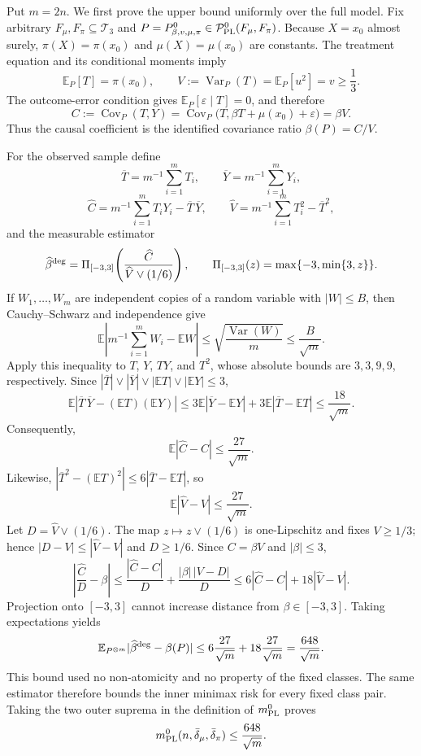 Put \(m=2n\). We first prove the upper bound uniformly over the full model. Fix arbitrary \(F_\mu,F_\pi\subseteq\mathcal T_3\) and \(P=P^0_{\beta,v,\mu,\pi}\in\mathcal P_{\rm PL}^{0}(F_\mu,F_\pi)\). Because \(X=x_0\) almost surely, \(\pi(X)=\pi(x_0)\) and \(\mu(X)=\mu(x_0)\) are constants. The treatment equation and its conditional moments imply
\[
\mathbb E_P[T]=\pi(x_0),\qquad V:=\operatorname{Var}_P(T)=\mathbb E_P[u^2]=v\ge\frac13.
\]
The outcome-error condition gives \(\mathbb E_P[\varepsilon\mid T]=0\), and therefore
\[
C:=\operatorname{Cov}_P(T,Y)=\operatorname{Cov}_P\bigl(T,\beta T+\mu(x_0)+\varepsilon\bigr)=\beta V.
\]
Thus the causal coefficient is the identified covariance ratio \(\beta(P)=C/V\).

For the observed sample define
\[
\overline T=m^{-1}\sum_{i=1}^mT_i,\qquad \overline Y=m^{-1}\sum_{i=1}^mY_i,
\]
\[
\widehat C=m^{-1}\sum_{i=1}^mT_iY_i-\overline T\,\overline Y,\qquad \widehat V=m^{-1}\sum_{i=1}^mT_i^2-\overline T^2,
\]
and the measurable estimator
\[
\widehat\beta^{\rm deg}=\Pi_{[-3,3]}\!\left(\frac{\widehat C}{\widehat V\vee(1/6)}\right),\qquad \Pi_{[-3,3]}(z)=\max\{-3,\min\{3,z\}\}.
\]
If \(W_1,\ldots,W_m\) are independent copies of a random variable with \(|W|\le B\), then Cauchy--Schwarz and independence give
\[
\mathbb E\left|m^{-1}\sum_{i=1}^mW_i-\mathbb EW\right|\le\sqrt{\frac{\operatorname{Var}(W)}m}\le\frac{B}{\sqrt m}.
\]
Apply this inequality to \(T\), \(Y\), \(TY\), and \(T^2\), whose absolute bounds are \(3,3,9,9\), respectively. Since \(|\overline T|\vee|\overline Y|\vee|\mathbb ET|\vee|\mathbb EY|\le3\),
\[
\mathbb E\left|\overline T\,\overline Y-(\mathbb ET)(\mathbb EY)\right|\le3\mathbb E|\overline Y-\mathbb EY|+3\mathbb E|\overline T-\mathbb ET|\le\frac{18}{\sqrt m}.
\]
Consequently,
\[
\mathbb E|\widehat C-C|\le\frac{27}{\sqrt m}.
\]
Likewise, \(|\overline T^2-(\mathbb ET)^2|\le6|\overline T-\mathbb ET|\), so
\[
\mathbb E|\widehat V-V|\le\frac{27}{\sqrt m}.
\]
Let \(D=\widehat V\vee(1/6)\). The map \(z\mapsto z\vee(1/6)\) is one-Lipschitz and fixes \(V\ge1/3\); hence \(|D-V|\le|\widehat V-V|\) and \(D\ge1/6\). Since \(C=\beta V\) and \(|\beta|\le3\),
\[
\left|\frac{\widehat C}{D}-\beta\right|\le\frac{|\widehat C-C|}{D}+\frac{|\beta|\,|V-D|}{D}\le6|\widehat C-C|+18|\widehat V-V|.
\]
Projection onto \([-3,3]\) cannot increase distance from \(\beta\in[-3,3]\). Taking expectations yields
\[
\mathbb E_{P^{\otimes m}}|\widehat\beta^{\rm deg}-\beta(P)|\le6\frac{27}{\sqrt m}+18\frac{27}{\sqrt m}=\frac{648}{\sqrt m}.
\]
This bound used no non-atomicity and no property of the fixed classes. The same estimator therefore bounds the inner minimax risk for every fixed class pair. Taking the two outer suprema in the definition of \(m_{\rm PL}^{0}\) proves
\[
m_{\rm PL}^{0}(n,\bar\delta_\mu,\bar\delta_\pi)\le\frac{648}{\sqrt m}.
\]

